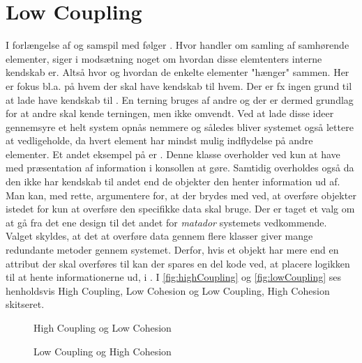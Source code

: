 \section{Low Coupling}\label{Chapter:Design patterns:Anvendelse:Low Coupling}
I forlængelse af og samspil med  følger . Hvor  handler om samling af samhørende elementer, siger  i modsætning noget om hvordan disse elemtenters interne kendskab er. Altså hvor og hvordan de enkelte elementer "hænger" sammen. Her er fokus bl.a. på hvem der skal have kendskab til hvem. Der er fx ingen grund til at lade  have kendskab til . En terning bruges af andre og der er dermed grundlag for at andre skal kende terningen, men ikke omvendt. Ved at lade disse ideer gennemsyre et helt system opnås  nemmere og således bliver systemet også lettere at vedligeholde, da hvert element har mindst mulig indflydelse på andre elementer. Et andet eksempel på  er . Denne klasse overholder  ved kun at have med præsentation af information i konsollen at gøre. Samtidig overholdes også  da den ikke har kendskab til andet end de objekter den henter information ud af. Man kan, med rette, argumentere for, at der brydes med  ved, at overføre objekter istedet for kun at overføre den specifikke data  skal bruge. Der er taget et valg om at gå fra det ene design til det andet for \textit{matador} systemets vedkommende. Valget skyldes, at det at overføre data gennem flere klasser giver mange redundante metoder gennem systemet. Derfor, hvis et objekt har mere end en attribut der skal overføres til  kan der spares en del kode ved, at placere logikken til at hente informationerne ud, i . I \vref{fig:highCoupling} og \vref{fig:lowCoupling} ses henholdsvis High Coupling, Low Cohesion og Low Coupling, High Cohesion skitseret.

\begin{figure}
\caption{High Coupling og Low Cohesion}
\label{fig:highCoupling}
\centering

\end{figure}

\begin{figure}
\caption{Low Coupling og High Cohesion}
\label{fig:lowCoupling}
\centering

\end{figure}

